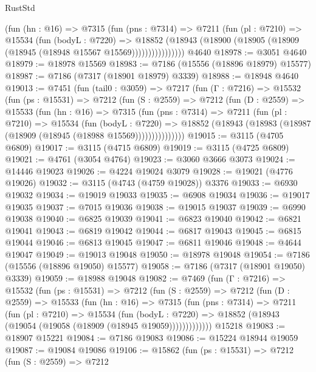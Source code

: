\begin{lexlean}{RustStd}
\begin{coremodule}
{\begin{coremodule}
{{{{{{{{{{{{{{{{{{{{{{{{{{{{{{{{                (fun (hn : @16) =>
                @7315
                  (fun (pns : @7314) =>
                  @7211
                    (fun (pl : @7210) =>
                    @15534
                      (fun (bodyL : @7220) =>
                      @18852
                        (@18943
                          (@18900 (@18905 (@18909 (@18945 (@18948 @15567 @15569))))))))))))))))
    @4640
@18978 := @3051 @4640
@18979 := @18978 @15569
@18983 := @7186 (@15556 (@18896 @18979) @15577)
@18987 := @7186 (@7317 (@18901 @18979) @3339)
@18988 := @18948 @4640
@19013 := @7451
    (fun (tail0 : @3059) =>
    @7217
      (fun (Γ : @7216) =>
      @15532
        (fun (ps : @15531) =>
        @7212
          (fun (S : @2559) =>
          @7212
            (fun (D : @2559) =>
            @15533
              (fun (hn : @16) =>
              @7315
                (fun (pns : @7314) =>
                @7211
                  (fun (pl : @7210) =>
                  @15534
                    (fun (bodyL : @7220) =>
                    @18852 (@18943 (@18983 (@18987 (@18909 (@18945 (@18988 @15569)))))))))))))))
@19015 := @3115 (@4705 @6809)
@19017 := @3115 (@4715 @6809)
@19019 := @3115 (@4725 @6809)
@19021 := @4761 (@3054 @4764)
@19023 := @3060 @3666 @3073
@19024 := @14446 @19023
@19026 := @4224 @19024 @3079
@19028 := @19021 (@4776 @19026)
@19032 := @3115 (@4743 (@4759 @19028)) @3376
@19033 := @6930 @19032
@19034 := @19019 @19033
@19035 := @6908 @19034
@19036 := @19017 @19035
@19037 := @7015 @19036
@19038 := @19015 @19037
@19039 := @6990 @19038
@19040 := @6825 @19039
@19041 := @6823 @19040
@19042 := @6821 @19041
@19043 := @6819 @19042
@19044 := @6817 @19043
@19045 := @6815 @19044
@19046 := @6813 @19045
@19047 := @6811 @19046
@19048 := @4644 @19047
@19049 := @19013 @19048
@19050 := @18978 @19048
@19054 := @7186 (@15556 (@18896 @19050) @15577)
@19058 := @7186 (@7317 (@18901 @19050) @3339)
@19059 := @18988 @19048
@19082 := @7469
    (fun (Γ : @7216) =>
    @15532
      (fun (ps : @15531) =>
      @7212
        (fun (S : @2559) =>
        @7212
          (fun (D : @2559) =>
          @15533
            (fun (hn : @16) =>
            @7315
              (fun (pns : @7314) =>
              @7211
                (fun (pl : @7210) =>
                @15534
                  (fun (bodyL : @7220) =>
                  @18852 (@18943 (@19054 (@19058 (@18909 (@18945 @19059)))))))))))))
    @15218
@19083 := @18907 @15221
@19084 := @7186 @19083
@19086 := @15224 @18944 @19059
@19087 := @19084 @19086
@19106 := @15862
    (fun (ps : @15531) =>
    @7212
      (fun (S : @2559) =>
      @7212
}}}}}}}}}}}}}}}}}}}}}}}}}}}}}}}}
\end{coremodule}}
\end{coremodule}
\end{lexlean}
